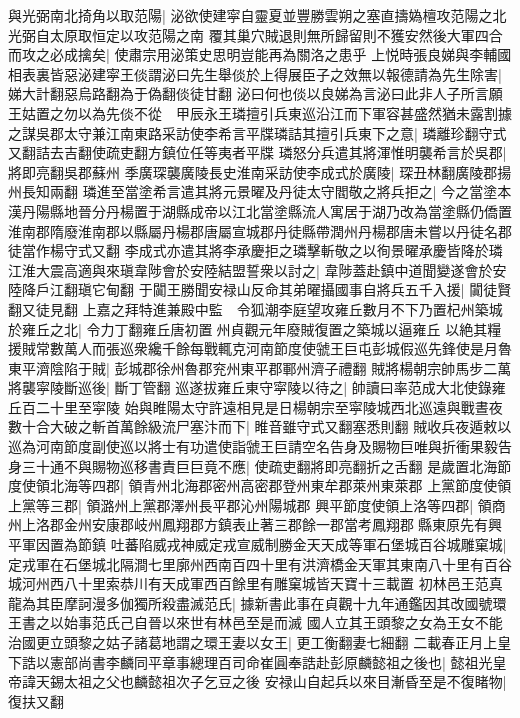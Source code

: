 與光弼南北掎角以取范陽|{
	泌欲使建寜自靈夏並豐勝雲朔之塞直擣媯檀攻范陽之北光弼自太原取恒定以攻范陽之南}
覆其巢穴賊退則無所歸留則不獲安然後大軍四合而攻之必成擒矣|{
	使肅宗用泌策史思明豈能再為關洛之患乎}
上悦時張良娣與李輔國相表裏皆惡泌建寜王倓謂泌曰先生舉倓於上得展臣子之效無以報德請為先生除害|{
	娣大計翻惡烏路翻為于偽翻倓徒甘翻}
泌曰何也倓以良娣為言泌曰此非人子所言願王姑置之勿以為先倓不從　甲辰永王璘擅引兵東巡沿江而下軍容甚盛然猶未露割據之謀吳郡太守兼江南東路采訪使李希言平牒璘詰其擅引兵東下之意|{
	璘離珍翻守式又翻詰去吉翻使疏吏翻方鎮位任等夷者平牒}
璘怒分兵遣其將渾惟明襲希言於吳郡|{
	將即亮翻吳郡蘇州}
季廣琛襲廣陵長史淮南采訪使李成式於廣陵|{
	琛丑林翻廣陵郡揚州長知兩翻}
璘進至當塗希言遣其將元景曜及丹徒太守閻敬之將兵拒之|{
	今之當塗本漢丹陽縣地晉分丹楊置于湖縣成帝以江北當塗縣流人寓居于湖乃改為當塗縣仍僑置淮南郡隋廢淮南郡以縣屬丹楊郡唐屬宣城郡丹徒縣帶潤州丹楊郡唐未嘗以丹徒名郡徒當作楊守式又翻}
李成式亦遣其將李承慶拒之璘擊斬敬之以徇景曜承慶皆降於璘江淮大震高適與來瑱韋陟會於安陸結盟誓衆以討之|{
	韋陟蓋赴鎮中道聞變遂會於安陸降戶江翻瑱它甸翻}
于闐王勝聞安禄山反命其弟曜攝國事自將兵五千入援|{
	闐徒賢翻又徒見翻}
上嘉之拜特進兼殿中監　令狐潮李庭望攻雍丘數月不下乃置杞州築城於雍丘之北|{
	令力丁翻雍丘唐初置州貞觀元年廢賊復置之築城以逼雍丘}
以絶其糧援賊常數萬人而張巡衆纔千餘每戰輒克河南節度使虢王巨屯彭城假巡先鋒使是月魯東平濟陰陷于賊|{
	彭城郡徐州魯郡兖州東平郡鄆州濟子禮翻}
賊將楊朝宗帥馬步二萬將襲寜陵斷巡後|{
	斷丁管翻}
巡遂拔雍丘東守寜陵以待之|{
	帥讀曰率范成大北使錄雍丘百二十里至寜陵}
始與睢陽太守許遠相見是日楊朝宗至寜陵城西北巡遠與戰晝夜數十合大破之斬首萬餘級流尸塞汴而下|{
	睢音雖守式又翻塞悉則翻}
賊收兵夜遁敕以巡為河南節度副使巡以將士有功遣使詣虢王巨請空名告身及賜物巨唯與折衝果毅告身三十通不與賜物巡移書責巨巨竟不應|{
	使疏吏翻將即亮翻折之舌翻}
是歲置北海節度使領北海等四郡|{
	領青州北海郡密州高密郡登州東牟郡萊州東萊郡}
上黨節度使領上黨等三郡|{
	領潞州上黨郡澤州長平郡沁州陽城郡}
興平節度使領上洛等四郡|{
	領商州上洛郡金州安康郡岐州鳳翔郡方鎮表止著三郡餘一郡當考鳳翔郡縣東原先有興平軍因置為節鎮}
吐蕃陷威戎神威定戎宣威制勝金天天成等軍石堡城百谷城雕窠城|{
	定戎軍在石堡城北隔澗七里廓州西南百四十里有洪濟橋金天軍其東南八十里有百谷城河州西八十里索恭川有天成軍西百餘里有雕窠城皆天寶十三載置}
初林邑王范真龍為其臣摩訶漫多伽獨所殺盡滅范氏|{
	據新書此事在貞觀十九年通鑑因其改國號環王書之以始事范氏己自晉以來世有林邑至是而滅}
國人立其王頭黎之女為王女不能治國更立頭黎之姑子諸葛地謂之環王妻以女王|{
	更工衡翻妻七細翻}
二載春正月上皇下誥以憲部尚書李麟同平章事總理百司命崔圓奉誥赴彭原麟懿祖之後也|{
	懿祖光皇帝諱天錫太祖之父也麟懿祖次子乞豆之後}
安禄山自起兵以來目漸昏至是不復睹物|{
	復扶又翻}
